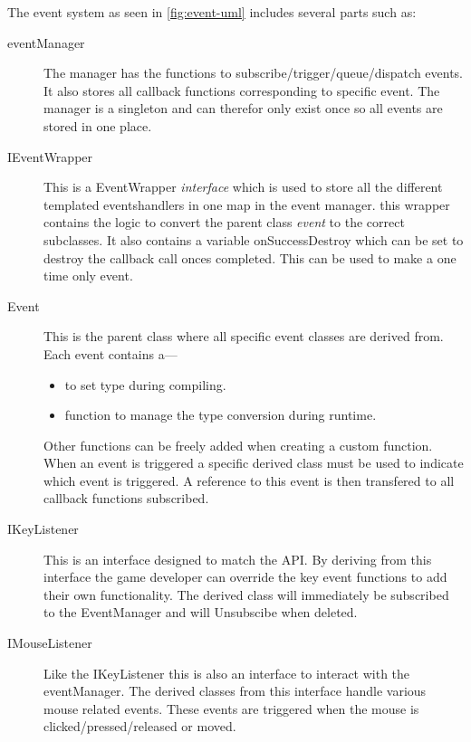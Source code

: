\documentclass{projdoc}
\begin{document}
The event system as seen in \cref{fig:event-uml} includes several parts such
as:\noparbreak
\begin{description}
	\item[eventManager] The manager has the functions to
		subscribe/trigger/queue/dispatch events. It also stores all callback functions
		corresponding to specific event. The manager is a singleton and can therefor only
		exist once so all events are stored in one place.
	\item[IEventWrapper] This is a EventWrapper \emph{interface} which is used to store
		all the different templated eventshandlers in one map in the event manager. this
		wrapper contains the logic to convert the parent class \emph{event} to the
		correct subclasses. It also contains a variable onSuccessDestroy which can be set
		to destroy the callback call onces completed. This can be used to make a one time
		only event.
	\item[Event] This is the parent class where all specific event classes are derived
		from. Each event contains a---
		\begin{itemize}
			\item \emph{} to set type
				during compiling.
			\item \emph{}
				function to manage the type conversion during runtime.
		\end{itemize}
		Other functions can be freely added when creating a custom function. When an
		event is triggered a specific derived class must be used to indicate which event
		is triggered. A reference to this event is then transfered to all callback
		functions subscribed.
	\item[IKeyListener] This is an interface designed to match the API. By deriving
		from this interface the game developer can override the key event functions to
		add their own functionality. The derived class will immediately be subscribed to
		the EventManager and will Unsubscibe when deleted.
	\item[IMouseListener] Like the IKeyListener this is also an interface to interact
		with the eventManager. The derived classes from this interface handle various
		mouse related events. These events are triggered when the mouse is
		clicked/pressed/released or moved.
\end{description}
\end{document}
